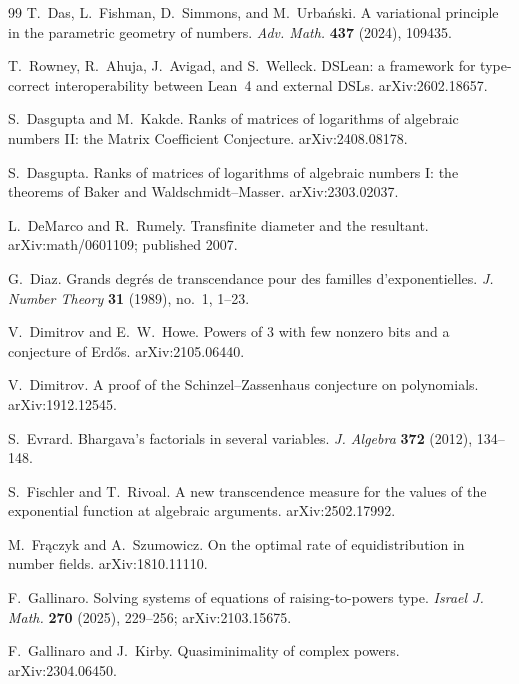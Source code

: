 \documentclass[10pt,letterpaper]{article}
\begin{document}
\begin{thebibliography}{99}
T.~Das, L.~Fishman, D.~Simmons, and M.~Urba\'nski.
\newblock A variational principle in the parametric geometry of numbers.
\newblock \emph{Adv. Math.} \textbf{437} (2024), 109435.

T.~Rowney, R.~Ahuja, J.~Avigad, and S.~Welleck.
\newblock DSLean: a framework for type-correct interoperability between Lean~4 and external DSLs.
\newblock arXiv:2602.18657.

S.~Dasgupta and M.~Kakde.
\newblock Ranks of matrices of logarithms of algebraic numbers II: the Matrix Coefficient Conjecture.
\newblock arXiv:2408.08178.

S.~Dasgupta.
\newblock Ranks of matrices of logarithms of algebraic numbers I: the theorems of Baker and Waldschmidt--Masser.
\newblock arXiv:2303.02037.

L.~DeMarco and R.~Rumely.
\newblock Transfinite diameter and the resultant.
\newblock arXiv:math/0601109; published 2007.

G.~Diaz.
\newblock Grands degr\'es de transcendance pour des familles d'exponentielles.
\newblock \emph{J. Number Theory} \textbf{31} (1989), no.~1, 1--23.

V.~Dimitrov and E.~W.~Howe.
\newblock Powers of $3$ with few nonzero bits and a conjecture of Erd\H{o}s.
\newblock arXiv:2105.06440.

V.~Dimitrov.
\newblock A proof of the Schinzel--Zassenhaus conjecture on polynomials.
\newblock arXiv:1912.12545.

S.~Evrard.
\newblock Bhargava's factorials in several variables.
\newblock \emph{J. Algebra} \textbf{372} (2012), 134--148.

S.~Fischler and T.~Rivoal.
\newblock A new transcendence measure for the values of the exponential function at algebraic arguments.
\newblock arXiv:2502.17992.

M.~Fr\k{a}czyk and A.~Szumowicz.
\newblock On the optimal rate of equidistribution in number fields.
\newblock arXiv:1810.11110.

F.~Gallinaro.
\newblock Solving systems of equations of raising-to-powers type.
\newblock \emph{Israel J. Math.} \textbf{270} (2025), 229--256; arXiv:2103.15675.

F.~Gallinaro and J.~Kirby.
\newblock Quasiminimality of complex powers.
\newblock arXiv:2304.06450.


\end{thebibliography}
\end{document}
